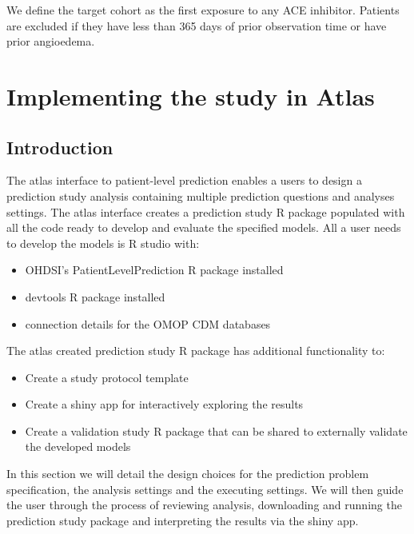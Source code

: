 \documentclass[11pt]{book}
\providecommand{\tightlist}{%
  \setlength{\itemsep}{0pt}\setlength{\parskip}{0pt}}
\theoremstyle{definition}
\theoremstyle{definition}
\theoremstyle{definition}
\theoremstyle{remark}
\begin{document}
We define the target cohort as the first exposure to any ACE inhibitor. Patients are excluded if they have less than 365 days of prior observation time or have prior angioedema.

\newpage

\hypertarget{implementing-the-study-in-atlas}{%
\section{Implementing the study in Atlas}\label{implementing-the-study-in-atlas}}

\hypertarget{introduction-1}{%
\subsection{Introduction}\label{introduction-1}}

The atlas interface to patient-level prediction enables a users to design a prediction study analysis containing multiple prediction questions and analyses settings. The atlas interface creates a prediction study R package populated with all the code ready to develop and evaluate the specified models. All a user needs to develop the models is R studio with:

\begin{itemize}
\tightlist
\item
  OHDSI's PatientLevelPrediction R package installed
\item
  devtools R package installed
\item
  connection details for the OMOP CDM databases
\end{itemize}

The atlas created prediction study R package has additional functionality to:

\begin{itemize}
\tightlist
\item
  Create a study protocol template
\item
  Create a shiny app for interactively exploring the results
\item
  Create a validation study R package that can be shared to externally validate the developed models
\end{itemize}

In this section we will detail the design choices for the prediction problem specification, the analysis settings and the executing settings. We will then guide the user through the process of reviewing analysis, downloading and running the prediction study package and interpreting the results via the shiny app.
\end{document}
